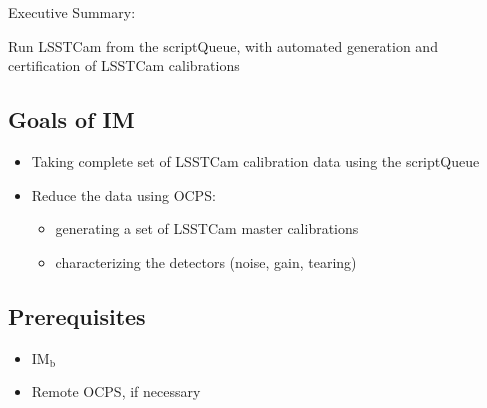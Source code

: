 
Executive Summary:

Run LSSTCam from the scriptQueue, with automated generation and certification of LSSTCam calibrations

\subsection{Goals of IM}
\begin{itemize}
\item Taking complete set of LSSTCam calibration data using the scriptQueue
\item Reduce the data using \gls{OCPS}:
  \begin{itemize}
  \item generating a set of LSSTCam master calibrations
  \item characterizing the detectors (noise, gain, tearing)
  \end{itemize}
\end{itemize}
\subsection{Prerequisites}

\begin{itemize}
\item{IM\(_{\text{b}}\)}
\item{Remote \gls{OCPS}, if necessary}
\end{itemize}

